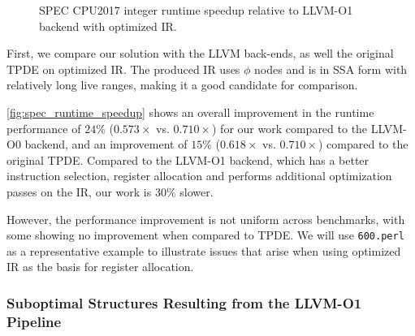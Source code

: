 \begin{figure}[t]
    \caption{SPEC CPU2017 integer runtime speedup relative to LLVM-O1 backend with optimized IR.}
    \label{fig:spec_runtime_speedup}
\end{figure}

First, we compare our solution with the LLVM back-ends, as well the original TPDE on optimized IR. 
The produced IR uses $\phi$ nodes and is in SSA form with relatively long live ranges, making it a good candidate for comparison.

\autoref{fig:spec_runtime_speedup} shows an overall improvement in the runtime performance of $24\%$ ($0.573\times$ vs. $0.710\times$) for our work compared to the LLVM-O0 backend, and an improvement of $15\%$ ($0.618\times$ vs. $0.710\times$) compared to the original TPDE. Compared to the LLVM-O1 backend, which has a better instruction selection, register allocation and performs additional optimization passes on the IR, our work is $30\%$ slower. 

However, the performance improvement is not uniform 
 across benchmarks, with some showing no improvement when compared to TPDE.
We will use \texttt{600.perl} as a representative example to illustrate issues that arise when using optimized IR as the basis for register allocation.

\subsubsection{Suboptimal Structures Resulting from the LLVM-O1 Pipeline}

